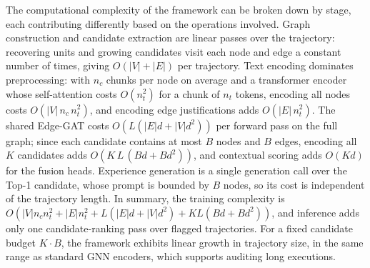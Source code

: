 The computational complexity of the framework can be broken down by stage, each contributing differently based on the operations involved. Graph construction and candidate extraction are linear passes over the trajectory: recovering units and growing candidates visit each node and edge a constant number of times, giving $O(|V|+|E|)$ per trajectory. Text encoding dominates preprocessing: with $n_c$ chunks per node on average and a transformer encoder whose self-attention costs $O(n_t^2)$ for a chunk of $n_t$ tokens, encoding all nodes costs $O(|V|\,n_c\,n_t^{2})$, and encoding edge justifications adds $O(|E|\,n_t^{2})$. The shared Edge-GAT costs $O(L(|E|d+|V|d^{2}))$ per forward pass on the full graph; since each candidate contains at most $B$ nodes and $B$ edges, encoding all $K$ candidates adds $O(K\,L\,(Bd+Bd^{2}))$, and contextual scoring adds $O(Kd)$ for the fusion heads. Experience generation is a single generation call over the Top-1 candidate, whose prompt is bounded by $B$ nodes, so its cost is independent of the trajectory length. In summary, the training complexity is
$O(|V|n_cn_t^{2}+|E|n_t^{2}+L(|E|d+|V|d^{2})+KL(Bd+Bd^{2}))$,
and inference adds only one candidate-ranking pass over flagged trajectories. For a fixed candidate budget $K\cdot B$, the framework exhibits linear growth in trajectory size, in the same range as standard GNN encoders, which supports auditing long executions.

